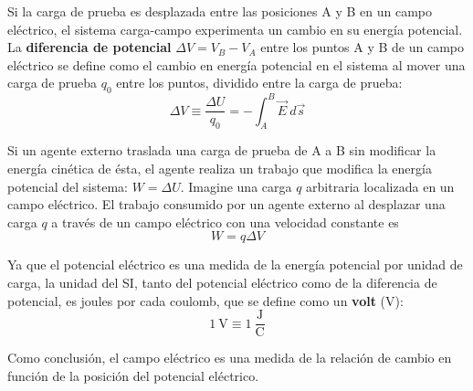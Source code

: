   \PN Si la carga de prueba es desplazada entre las posiciones A y B en un campo eléctrico, el sistema carga-campo
  experimenta un cambio en su energía potencial. La \textbf{diferencia de potencial} $\Delta V = V_{B} - V_{A}$ entre
  los puntos A y B de un campo eléctrico se define como el cambio en energía potencial en el sistema al mover una carga
  de prueba $q_{0}$ entre los puntos, dividido entre la carga de prueba:
  \begin{equation*}
    \Delta V \equiv \frac{\Delta U}{q_{0}} = - \int_{A}^{B} \vec{E} \ d\vec{s}
  \end{equation*}

  \PN Si un agente externo traslada una carga de prueba de A a B sin modificar la energía cinética de ésta, el agente
  realiza un trabajo que modifica la energía potencial del sistema: $W = \Delta U$. Imagine una carga $q$ arbitraria
  localizada en un campo eléctrico. El trabajo consumido por un agente externo al desplazar una carga $q$ a través de un
  campo eléctrico con una velocidad constante es
  \begin{equation*}
    W = q \Delta V
  \end{equation*}

  \PN Ya que el potencial eléctrico es una medida de la energía potencial por unidad de carga, la unidad del SI, tanto
  del potencial eléctrico como de la diferencia de potencial, es joules por cada coulomb, que se define como un
  \textbf{volt} (V):
  \begin{equation*}
    1 \ \text{V} \equiv 1 \ \frac{\text{J}}{\text{C}}
  \end{equation*}

  \PN Como conclusión, el campo eléctrico es una medida de la relación de cambio en función de la posición del potencial
  eléctrico.
